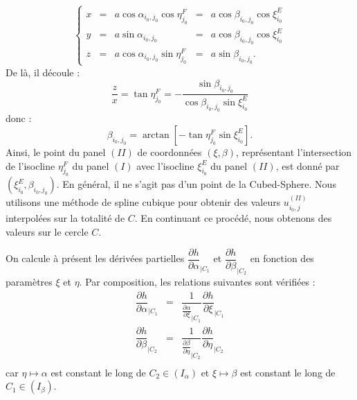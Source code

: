 \begin{equation}
\left\lbrace
\begin{array}{rcccl}
x & = & a \cos \alpha_{i_0, j_0} \cos \eta^F_{j_0} & = & a \cos \beta_{i_0, j_0} \cos \xi^E_{i_0} \\
y & = & a \sin \alpha_{i_0, j_0} & = & a \cos \beta_{i_0, j_0} \cos \xi^E_{i_0} \\
z & = & a \cos \alpha_{i_0, j_0} \sin \eta^F_{j_0}  & = & a \sin \beta_{i_0, j_0}.
\end{array}
\right.
\end{equation}
De là, il découle :
\begin{equation}
\dfrac{z}{x} = \tan \eta^F_{j_0} = - \dfrac{\sin \beta_{i_0, j_0}}{\cos \beta_{i_0, j_0} \sin \xi^E_{i_0}}
\end{equation}
donc :
\begin{equation}
\beta_{i_0, j_0} = \arctan \left[ - \tan \eta^F_{j_0} \sin \xi^E_{i_0} \right].
\label{eq:coord_cross}
\end{equation}
Ainsi, le point du panel $(II)$ de coordonnées $(\xi, \beta)$, représentant l'intersection de l'isocline $\eta^F_{j_0}$ du panel $(I)$ avec l'isocline $\xi_{i_0}^E$ du panel $(II)$, est donné par $(\xi^E_{i_0}, \beta_{i_0, j_0})$. En général, il ne s'agit pas d'un point de la Cubed-Sphere. Nous utilisons une méthode de spline cubique pour obtenir des valeurs $u_{i_0,j}^{(II)}$ interpolées sur la totalité de $C$.
En continuant ce procédé, nous obtenons des valeurs sur le cercle $C$.







On calcule à présent les dérivées partielles $\dfrac{\partial h}{\partial \alpha}_{|C_1}$ et $\dfrac{\partial h}{\partial \beta}_{|C_2}$ en fonction des paramètres $\xi$ et $\eta$. Par composition, les relations suivantes sont vérifiées :
\begin{equation}
\begin{array}{rcl}
\dfrac{\partial h}{\partial \alpha}_{|C_1} & = &  \dfrac{1}{\frac{\partial \alpha}{\partial \xi}_{|C_1}} \dfrac{\partial h}{\partial \xi}_{|C_1} \\
\dfrac{\partial h}{\partial \beta}_{|C_2} & = &  \dfrac{1}{\frac{\partial \beta}{\partial \eta}_{|C_2}} \dfrac{\partial h}{\partial \eta}_{|C_2} \\
\end{array}
\label{eq: derivee partiel link}
\end{equation}
car $\eta \mapsto \alpha$ est constant le long de $C_2 \in (I_{\alpha})$ et $\xi \mapsto \beta$ est constant le long de $C_1 \in (I_{\beta})$. 






